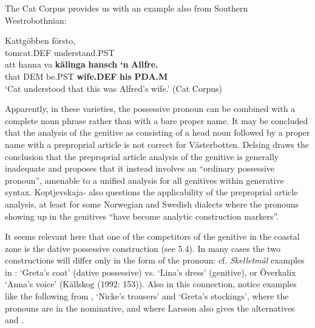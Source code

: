 {
\z 
\z

The Cat Corpus provides us with an example also from Southern Westrobothnian:


\ea\label{}
\gll Kattgöbben  försto,\\
tomcat.DEF  understand.PST\\
\gll att  hanna  va  \textbf{kälinga}\textbf{  hansch}\textbf{  ‘n}\textbf{  Allfre.}\\
that  DEM  be.PST  \textbf{wife.DEF} \textbf{his} \textbf{PDA.M} \\
\glt ‘Cat understood that this was Alfred’s wife.’ (Cat Corpus)
\z

Apparently, in these varieties, the possessive pronoun can be combined with a complete noun phrase rather than with a bare proper name. It may be concluded that the analysis of the genitive as consisting of a head noun followed by a proper name with a preproprial article is not correct for Västerbotten.  Delsing draws the conclusion that the preproprial article analysis of the genitive is generally inadequate and proposes that it instead involves an “ordinary possessive pronoun”, amenable to a unified analysis for all genitives within generative syntax. Koptjevskaja-\citet{Tamm2003} also questions the applicability of the preproprial article analysis, at least for some Norwegian and Swedish dialects where the pronouns showing up in the genitives “have become analytic construction markers”. 


It seems relevant here that one of the competitors of the genitive in the coastal zone is the dative possessive construction (see 5.4). In many cases the two constructions will differ only in the form of the pronoun: cf. \textit{Skelletmål} examples in \citet{Marklund1976}:  ‘Greta’s coat’ (dative possessive) vs.   ‘Lina’s dress’ (genitive), or Överkalix  ‘Anna’s voice’ (Källskog (1992: 153)). Also in this connection, notice examples like the following from \citet[125]{Larsson1929}, ‘Nicke’s trousers’ and  ‘Greta’s stockings’, where the pronouns are in the nominative, and where Larsson also gives the alternatives  and .

}
